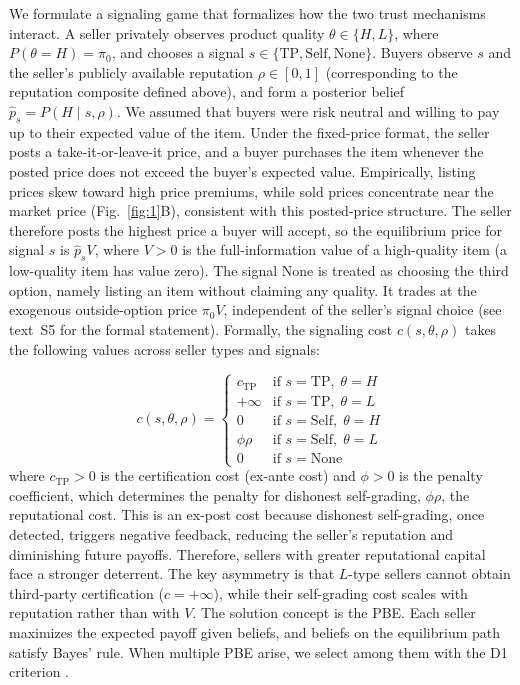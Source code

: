 \documentclass[11pt,letterpaper]{article}
\theoremstyle{definition}
\begin{document}
We formulate a signaling game that formalizes how the two trust mechanisms interact. A seller privately observes product quality $\theta \in \{H, L\}$, where $P(\theta = H) = \pi_0$, and chooses a signal $s \in \{\text{TP}, \text{Self}, \text{None}\}$. Buyers observe $s$ and the seller's publicly available reputation $\rho \in [0, 1]$ (corresponding to the reputation composite defined above), and form a posterior belief $\hat{p}_s = P(H \mid s, \rho)$. We assumed that buyers were risk neutral and willing to pay up to their expected value of the item. Under the fixed-price format, the seller posts a take-it-or-leave-it price, and a buyer purchases the item whenever the posted price does not exceed the buyer's expected value. Empirically, listing prices skew toward high price premiums, while sold prices concentrate near the market price (Fig.~\ref{fig:1}B), consistent with this posted-price structure. The seller therefore posts the highest price a buyer will accept, so the equilibrium price for signal $s$ is $\hat{p}_s V$, where $V > 0$ is the full-information value of a high-quality item (a low-quality item has value zero). The signal None is treated as choosing the third option, namely listing an item without claiming any quality. It trades at the exogenous outside-option price $\pi_0 V$, independent of the seller's signal choice (see text~S5 for the formal statement). Formally, the signaling cost $c(s, \theta, \rho)$ takes the following values across seller types and signals:

\begin{equation*}
c(s, \theta, \rho) = \begin{cases} c_{\text{TP}} & \text{if } s = \text{TP},\; \theta = H \\ +\infty & \text{if } s = \text{TP},\; \theta = L \\ 0 & \text{if } s = \text{Self},\; \theta = H \\ \phi\rho & \text{if } s = \text{Self},\; \theta = L \\ 0 & \text{if } s = \text{None} \end{cases}
\end{equation*}
where $c_{\text{TP}} > 0$ is the certification cost (ex-ante cost) and $\phi > 0$ is the penalty coefficient, which determines the penalty for dishonest self-grading, $\phi\rho$, the reputational cost. This is an ex-post cost because dishonest self-grading, once detected, triggers negative feedback, reducing the seller's reputation and diminishing future payoffs. Therefore, sellers with greater reputational capital face a stronger deterrent. The key asymmetry is that $L$-type sellers cannot obtain third-party certification ($c = +\infty$), while their self-grading cost scales with reputation rather than with $V$. The solution concept is the PBE. Each seller maximizes the expected payoff given beliefs, and beliefs on the equilibrium path satisfy Bayes' rule. When multiple PBE arise, we select among them with the D1 criterion \citep{ChoKreps1987, BanksSobel1987, ChoSobel1990}.
\end{document}
